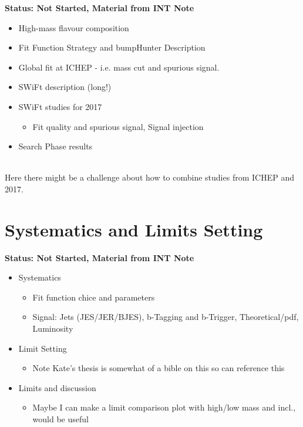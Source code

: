 \textbf{Status: Not Started, Material from INT Note}


\begin{itemize}
  \item{High-mass flavour composition}
  \item{Fit Function Strategy and  bumpHunter Description}
  \item{Global fit at ICHEP - i.e. mass cut and spurious signal.}
  \item{SWiFt description (long!) }
  \item{SWiFt studies for 2017}
  \begin{itemize}[label={$-$}]
    \item{Fit quality and spurious signal, Signal injection}
  \end{itemize}
  \item{Search Phase results}
\end{itemize}
\noindent\\
Here there might be a challenge about how to combine studies from ICHEP and 2017.    

\section{Systematics and Limits Setting}


\textbf{Status: Not Started, Material from INT Note}

  \begin{itemize}
  \item{Systematics} 
    \begin{itemize}[label={$-$}]
    \item{Fit function chice and parameters}
    \item{Signal: Jets (JES/JER/BJES), b-Tagging and b-Trigger, Theoretical/pdf, Luminosity}
    \end{itemize}
  \item{Limit Setting}
    \begin{itemize}[label={$-$}]
    \item{Note Kate's thesis is somewhat of a bible on this so can reference this}
    \end{itemize}
  \item{Limits and discussion}
    \begin{itemize}[label={$-$}]
    \item{Maybe I can make a limit comparison plot with high/low mass and incl., would be useful}
    \end{itemize}
  \end{itemize}

